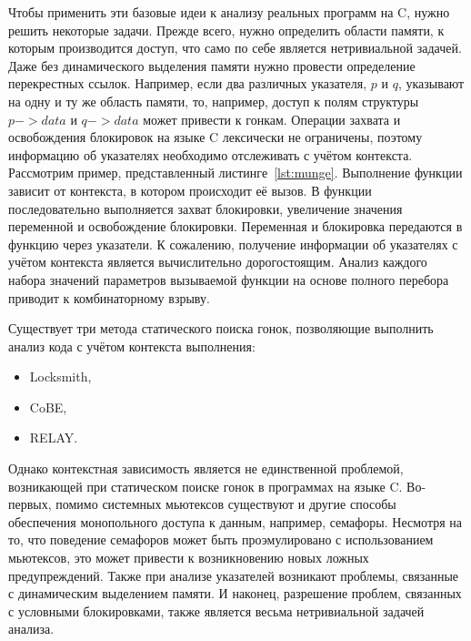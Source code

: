 Чтобы применить эти базовые идеи к анализу реальных программ на C, нужно решить некоторые задачи. Прежде всего, нужно определить области памяти, к которым производится доступ, что само по себе является нетривиальной задачей. Даже без динамического выделения памяти нужно провести определение перекрестных ссылок. Например, если два различных указателя, $p$ и $q$, указывают на одну и ту же область памяти, то, например, доступ к полям структуры $p->data$ и $q->data$ может привести к гонкам. Операции захвата и освобождения блокировок на языке C лексически не ограничены, поэтому информацию об указателях необходимо отслеживать с учётом контекста. Рассмотрим пример, представленный листинге~\ref{lst:munge}. Выполнение функции  зависит от контекста, в котором происходит её вызов. В функции последовательно выполняется захват блокировки, увеличение значения переменной и освобождение блокировки. Переменная и блокировка передаются в функцию через указатели. К сожалению, получение информации об указателях с учётом контекста является вычислительно дорогостоящим. Анализ каждого набора значений параметров вызываемой функции на основе полного перебора приводит к комбинаторному взрыву.



Существует три метода статического поиска гонок, позволяющие выполнить анализ кода с учётом контекста выполнения:

\begin{itemize}
  \item Locksmith,
  \item CoBE,
  \item RELAY.
\end{itemize}

Однако контекстная зависимость является не единственной проблемой, возникающей при статическом поиске гонок в программах на языке C. Во-первых, помимо системных мьютексов существуют и другие способы обеспечения монопольного доступа к данным, например, семафоры. Несмотря на то, что поведение семафоров может быть проэмулировано с использованием мьютексов, это может привести к возникновению новых ложных предупреждений. Также при анализе указателей возникают проблемы, связанные с динамическим выделением памяти. И наконец, разрешение проблем, связанных с условными блокировками, также является весьма нетривиальной задачей анализа.

